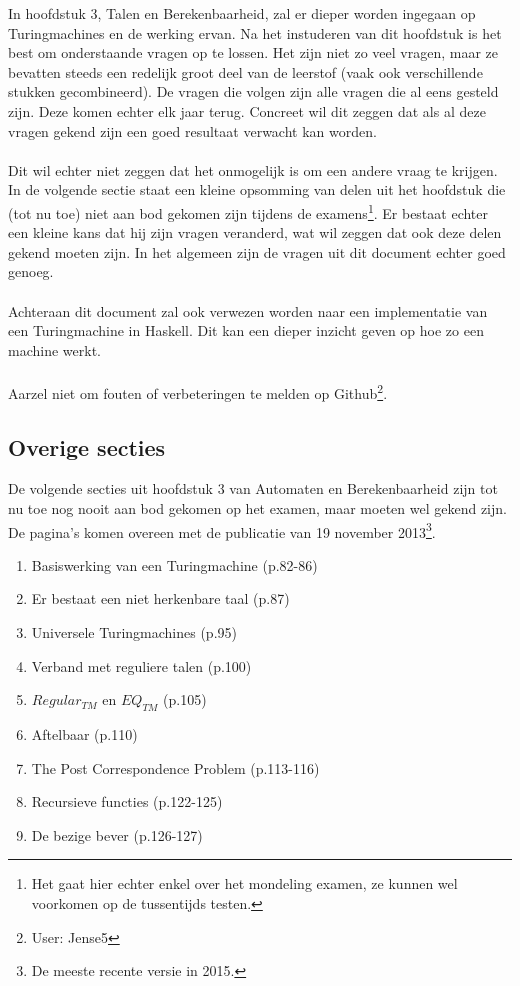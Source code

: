 \documentclass[10pt,a4paper]{article}
\begin{document}
\vspace{3mm}
In hoofdstuk 3, Talen en Berekenbaarheid, zal er dieper worden ingegaan op Turingmachines en de werking ervan. Na het instuderen van dit hoofdstuk is het best om onderstaande vragen op te lossen. Het zijn niet zo veel vragen, maar ze bevatten steeds een redelijk groot deel van de leerstof (vaak ook verschillende stukken gecombineerd). De vragen die volgen zijn alle vragen die al eens gesteld zijn. Deze komen echter elk jaar terug. Concreet wil dit zeggen dat als al deze vragen gekend zijn een goed resultaat verwacht kan worden.
\\\\
Dit wil echter niet zeggen dat het onmogelijk is om een andere vraag te krijgen. In de volgende sectie staat een kleine opsomming van delen uit het hoofdstuk die (tot nu toe) niet aan bod gekomen zijn tijdens de examens\footnote{Het gaat hier echter enkel over het mondeling examen, ze kunnen wel voorkomen op de tussentijds testen.}. Er bestaat echter een kleine kans dat hij zijn vragen veranderd, wat wil zeggen dat ook deze delen gekend moeten zijn. In het algemeen zijn de vragen uit dit document echter goed genoeg.
\\\\
Achteraan dit document zal ook verwezen worden naar een implementatie van een Turingmachine in Haskell. Dit kan een dieper inzicht geven op hoe zo een machine werkt.
\\\\
Aarzel niet om fouten of verbeteringen te melden op Github\footnote{User: Jense5}.

\subsection{Overige secties}

De volgende secties uit hoofdstuk 3 van Automaten en Berekenbaarheid zijn tot nu toe nog nooit aan bod gekomen op het examen, maar moeten wel gekend zijn. De pagina's komen overeen met de publicatie van 19 november 2013\footnote{De meeste recente versie in 2015.}.
\begin{enumerate}
	\item Basiswerking van een Turingmachine (p.82-86)
	\item Er bestaat een niet herkenbare taal (p.87)
	\item Universele Turingmachines (p.95)
	\item Verband met reguliere talen (p.100)
	\item $Regular_{TM}$ en $EQ_{TM}$ (p.105)
	\item Aftelbaar (p.110)
	\item The Post Correspondence Problem (p.113-116)
	\item Recursieve functies (p.122-125)
	\item De bezige bever (p.126-127)
\end{enumerate}
\end{document}
